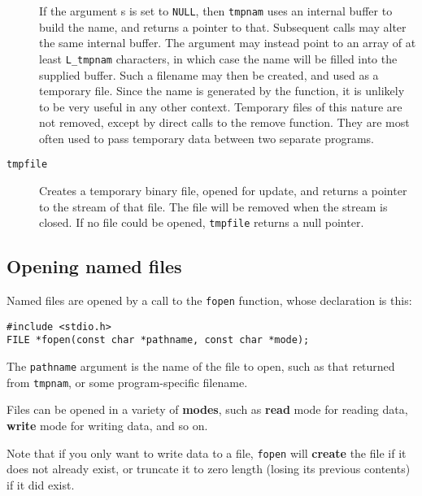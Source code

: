 \begin{description}
     If the argument s is set to \texttt{NULL},  then
      \texttt{tmpnam}  uses  an
      internal  buffer to build the name, and returns a pointer
      to that. Subsequent calls may  alter  the  same  internal
      buffer.  The argument may instead point to an array of at
      least \texttt{L\_tmpnam} characters, in which case the name will be
      filled  into  the  supplied  buffer.  Such a filename may
      then be created, and used as a temporary file. Since  the
      name  is  generated by the function, it is unlikely to be
      very useful in any other context. Temporary files of this
      nature  are  not  removed,  except by direct calls to the
      remove  function.  They  are  most  often  used  to  pass
      temporary data between two separate programs.

    

    \item[\texttt{tmpfile}] Creates a temporary binary file, opened for  update,  and
     returns  a  pointer to the stream of that file.  The file
     will be removed when the stream is closed.   If  no  file
     could be opened, \texttt{tmpfile} returns a null pointer.
   \end{description}

  

  \subsection{Opening named files}
   

   Named files are opened by a call to the \texttt{fopen} function,
    whose declaration is this:


   \begin{Verbatim}
#include <stdio.h>
FILE *fopen(const char *pathname, const char *mode);
\end{Verbatim}

   The \texttt{pathname} argument is the name of the file to open,  such
    as  that  returned  from  \texttt{tmpnam},  or  some program-specific
    filename.


   Files can be opened in a variety of \textbf{modes}, such as
    \textbf{read} mode for reading data, \textbf{write} mode for writing
    data, and so on.


   Note that if you only want to write data to  a  file, \texttt{fopen}
    will  \textbf{create}  the  file  if  it  does  not already exist, or
    truncate it to zero length (losing its previous contents) if it did
    exist.


